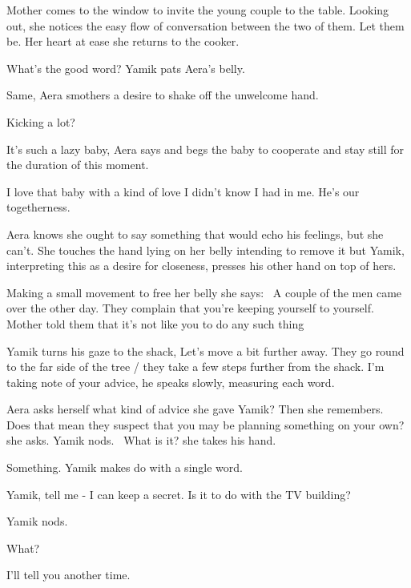 \documentclass[letterpaper]{article}
\begin{document}
Mother comes to the window to invite the young couple to the table. Looking out, she\textcolor{red}{ }notices the easy
flow of conversation between the two of them. Let them be. Her heart at ease she returns to the cooker.

{\textquotedbl}What's the good word?{\textquotedbl} Yamik pats Aera's belly. 

{\textquotedbl}Same,{\textquotedbl} Aera smothers a desire to shake off the unwelcome hand. 

{\textquotedbl}Kicking a lot?{\textquotedbl} 

{\textquotedbl}It's such a lazy baby,{\textquotedbl} Aera says and begs the baby to cooperate and stay still for the
duration of this moment. 

{\textquotedbl}I love that baby with a kind of love I didn't know I had in me. He's our togetherness.{\textquotedbl}

Aera knows she ought to say something that would echo his feelings, but she can't. She touches the hand lying on her
belly intending to remove it but Yamik, interpreting this as a desire for closeness, presses his other hand on top of
hers. ~

Making a small movement to free her belly she says: \ {\textquotedbl}A couple of the men came over the other day. They
complain that you're keeping yourself to yourself. Mother told them that it's not like you to do any such
thing{\textquotedbl} 

Yamik turns his gaze to the shack, {\textquotedbl}Let's move a bit further away.{\textquotedbl} They go round to the far
side of the tree / they take a few steps further from the shack. {\textquotedbl}I'm taking note of your
advice,{\textquotedbl} he speaks slowly, measuring each word. 

Aera asks herself what kind of advice she gave Yamik? Then she remembers. {\textquotedbl}Does that mean they suspect
that you may be planning something on your own?{\textquotedbl} she asks. Yamik nods. \ {\textquotedbl}What is
it?{\textquotedbl} she takes his hand. 

{\textquotedbl}Something.{\textquotedbl} Yamik makes do with a single word. 

{\textquotedbl}Yamik, tell me - I can keep a secret. Is it to do with the TV building?{\textquotedbl} 

Yamik nods. 

{\textquotedbl}What?{\textquotedbl} 

{\textquotedbl}I'll tell you another time.{\textquotedbl} 
\end{document}
